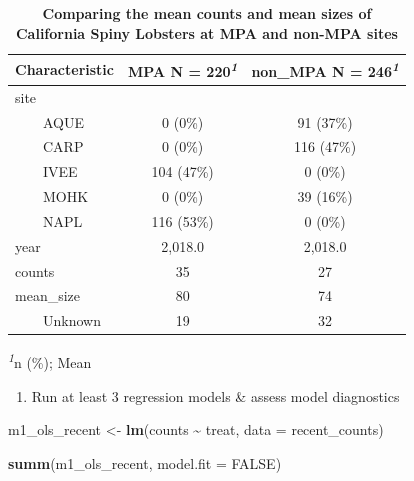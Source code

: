 \documentclass[
]{article}
\newenvironment{Shaded}{\begin{snugshade}}{\end{snugshade}}
\newcommand{\AttributeTok}[1]{\textcolor[rgb]{0.13,0.29,0.53}{#1}}
\newcommand{\ConstantTok}[1]{\textcolor[rgb]{0.56,0.35,0.01}{#1}}
\newcommand{\FunctionTok}[1]{\textcolor[rgb]{0.13,0.29,0.53}{\textbf{#1}}}
\newcommand{\NormalTok}[1]{#1}
\newcommand{\OtherTok}[1]{\textcolor[rgb]{0.56,0.35,0.01}{#1}}
\newcommand{\SpecialCharTok}[1]{\textcolor[rgb]{0.81,0.36,0.00}{\textbf{#1}}}
\providecommand{\tightlist}{%
  \setlength{\itemsep}{0pt}\setlength{\parskip}{0pt}}
\begin{document}
\begin{table}[!t]
\caption{\label{tab:unnamed-chunk-29}\textbf{Comparing the mean counts and mean sizes of California Spiny Lobsters at MPA and non-MPA sites}} 
\fontsize{12.0pt}{14.4pt}\selectfont
\begin{tabular*}{\linewidth}{@{\extracolsep{\fill}}lcc}
\toprule
\textbf{Characteristic} & \textbf{MPA}  N = 220\textsuperscript{\textit{1}} & \textbf{non\_MPA}  N = 246\textsuperscript{\textit{1}} \\ 
\midrule\addlinespace[2.5pt]
site &  &  \\ 
    AQUE & 0 (0\%) & 91 (37\%) \\ 
    CARP & 0 (0\%) & 116 (47\%) \\ 
    IVEE & 104 (47\%) & 0 (0\%) \\ 
    MOHK & 0 (0\%) & 39 (16\%) \\ 
    NAPL & 116 (53\%) & 0 (0\%) \\ 
year & 2,018.0 & 2,018.0 \\ 
counts & 35 & 27 \\ 
mean\_size & 80 & 74 \\ 
    Unknown & 19 & 32 \\ 
\bottomrule
\end{tabular*}
\begin{minipage}{\linewidth}
\textsuperscript{\textit{1}}n (\%); Mean\\
\end{minipage}
\end{table}

\begin{enumerate}
\def\labelenumi{\alph{enumi}.}
\setcounter{enumi}{1}
\tightlist
\item
  Run at least 3 regression models \& assess model diagnostics
\end{enumerate}

\begin{Shaded}
\begin{Highlighting}[]
\NormalTok{m1\_ols\_recent }\OtherTok{\textless{}{-}} \FunctionTok{lm}\NormalTok{(counts }\SpecialCharTok{\textasciitilde{}}\NormalTok{ treat, }\AttributeTok{data =}\NormalTok{ recent\_counts)}

\FunctionTok{summ}\NormalTok{(m1\_ols\_recent, }\AttributeTok{model.fit =} \ConstantTok{FALSE}\NormalTok{) }
\end{Highlighting}
\end{Shaded}
\end{document}
